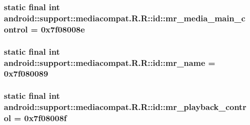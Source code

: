 \hypertarget{classandroid_1_1support_1_1mediacompat_1_1_r_1_1id_51d6c81374a0602c4fa1ff7127687262}{
\subsubsection[{mr\_\-media\_\-main\_\-control}]{\setlength{\rightskip}{0pt plus 5cm}static final int android::support::mediacompat.R.R::id::mr\_\-media\_\-main\_\-control = 0x7f08008e}}
\label{classandroid_1_1support_1_1mediacompat_1_1_r_1_1id_51d6c81374a0602c4fa1ff7127687262}


\hypertarget{classandroid_1_1support_1_1mediacompat_1_1_r_1_1id_971470d4a0396de33a9f1b6c7065e99d}{
\subsubsection[{mr\_\-name}]{\setlength{\rightskip}{0pt plus 5cm}static final int android::support::mediacompat.R.R::id::mr\_\-name = 0x7f080089}}
\label{classandroid_1_1support_1_1mediacompat_1_1_r_1_1id_971470d4a0396de33a9f1b6c7065e99d}


\hypertarget{classandroid_1_1support_1_1mediacompat_1_1_r_1_1id_a502a00683fef5790ced274a5dbcfcde}{
\subsubsection[{mr\_\-playback\_\-control}]{\setlength{\rightskip}{0pt plus 5cm}static final int android::support::mediacompat.R.R::id::mr\_\-playback\_\-control = 0x7f08008f}}
\label{classandroid_1_1support_1_1mediacompat_1_1_r_1_1id_a502a00683fef5790ced274a5dbcfcde}


